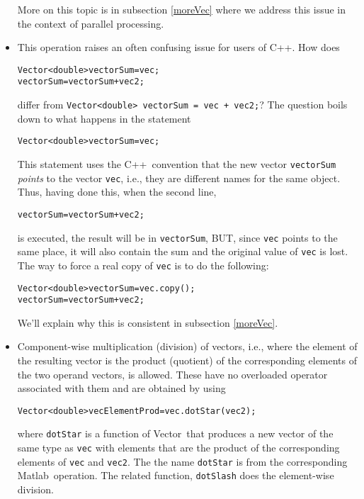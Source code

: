 \documentclass[12pt]{article}
\newcommand{\matlab}{{\sf Matlab}}
\newcommand{\epetra}{{\sf EPetra}}
\newcommand{\cpp}{{\sf C++}}
\renewcommand{\vector}{{\sf Vector}}
\newcommand{\lcode}[1]{{\tt #1}}
\newenvironment{dcode}{  \begin{center} 
    \begin{minipage}{.9\textwidth}
     \begin{alltt}}
{\end{alltt}
    \end{minipage}
  \end{center}}
\newcommand{\bdcode}{\begin{dcode}}
\newcommand{\edcode}{\end{dcode}}
\begin{document}
\begin{itemize}
More on this topic is in subsection \ref{moreVec} where we address
this issue in the context of parallel processing.
  \item This operation raises an often confusing issue for users of
\cpp.  How does
\bdcode
Vector<double> vectorSum = vec; 
vectorSum = vectorSum + vec2;
\edcode
differ from \lcode{Vector<double> vectorSum = vec + vec2;}?  The
question boils down to what happens in the statement
\bdcode
Vector<double> vectorSum = vec;
\edcode
This statement uses the \cpp\ convention that the new vector
\lcode{vectorSum} {\em points} to the vector \lcode{vec}, i.e.,
they are different names for the same object.  Thus, having done this,
when the second line, 
\bdcode
vectorSum = vectorSum + vec2;
\edcode 
is executed, the
result will be in \lcode{vectorSum}, BUT, since \lcode{vec} points to
the same place, it will also contain the sum and the original value of
\lcode{vec} is lost.  The way to force a real copy of \lcode{vec} is
to do the following:
\bdcode
Vector<double> vectorSum = vec.copy(); 
vectorSum = vectorSum + vec2;
\edcode
We'll explain why this is consistent in subsection \ref{moreVec}.
  \item Component-wise multiplication (division) of vectors, i.e.,
where the  element of the resulting vector is the product (quotient)
of the corresponding elements of the two operand vectors, is allowed.  These
have no overloaded operator associated with them and are obtained by
using 
\bdcode
Vector<double> vecElementProd = vec.dotStar(vec2);
\edcode
where \lcode{dotStar} is a function of \vector\ that produces a new
vector of the same type as \lcode{vec} with elements that are the
product of the corresponding elements of \lcode{vec} and
\lcode{vec2}. The the name \lcode{dotStar} is from the
corresponding \matlab\ operation.  The related function,
\lcode{dotSlash} does the element-wise division.
\end{itemize}
\end{document}
